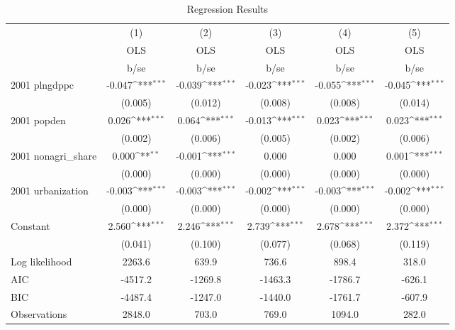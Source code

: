 \begin{table}[htbp]\centering
\def\sym#1{\ifmmode^{#1}\else\(^{#1}\)\fi}
\caption{Regression Results}
\begin{tabular}{l*{5}{c}}
\hline\hline
                    &\multicolumn{1}{c}{(1)}&\multicolumn{1}{c}{(2)}&\multicolumn{1}{c}{(3)}&\multicolumn{1}{c}{(4)}&\multicolumn{1}{c}{(5)}\\
                    &\multicolumn{1}{c}{OLS}&\multicolumn{1}{c}{OLS}&\multicolumn{1}{c}{OLS}&\multicolumn{1}{c}{OLS}&\multicolumn{1}{c}{OLS}\\
                    &        b/se         &        b/se         &        b/se         &        b/se         &        b/se         \\
\hline
2001 plngdppc       &      -0.047\sym{***}&      -0.039\sym{***}&      -0.023\sym{***}&      -0.055\sym{***}&      -0.045\sym{***}\\
                    &     (0.005)         &     (0.012)         &     (0.008)         &     (0.008)         &     (0.014)         \\
2001 popden         &       0.026\sym{***}&       0.064\sym{***}&      -0.013\sym{***}&       0.023\sym{***}&       0.023\sym{***}\\
                    &     (0.002)         &     (0.006)         &     (0.005)         &     (0.002)         &     (0.006)         \\
2001 nonagri\_share  &       0.000\sym{**} &      -0.001\sym{***}&       0.000         &       0.000         &       0.001\sym{***}\\
                    &     (0.000)         &     (0.000)         &     (0.000)         &     (0.000)         &     (0.000)         \\
2001 urbanization   &      -0.003\sym{***}&      -0.003\sym{***}&      -0.002\sym{***}&      -0.003\sym{***}&      -0.002\sym{***}\\
                    &     (0.000)         &     (0.000)         &     (0.000)         &     (0.000)         &     (0.000)         \\
Constant            &       2.560\sym{***}&       2.246\sym{***}&       2.739\sym{***}&       2.678\sym{***}&       2.372\sym{***}\\
                    &     (0.041)         &     (0.100)         &     (0.077)         &     (0.068)         &     (0.119)         \\
\hline
Log likelihood      &      2263.6         &       639.9         &       736.6         &       898.4         &       318.0         \\
AIC                 &     -4517.2         &     -1269.8         &     -1463.3         &     -1786.7         &      -626.1         \\
BIC                 &     -4487.4         &     -1247.0         &     -1440.0         &     -1761.7         &      -607.9         \\
Observations        &      2848.0         &       703.0         &       769.0         &      1094.0         &       282.0         \\
\hline\hline
\end{tabular}
\end{table}

